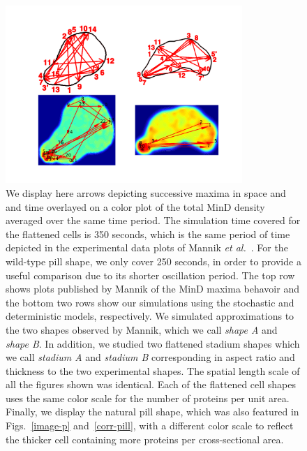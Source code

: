 \documentclass{pnastwo}
\begin{document}
\begin{figure}
  \centering
  \includegraphics[width=0.8\textwidth]{../paper/plot-ave}
  \caption{We display here arrows depicting successive maxima in space
    and and time overlayed on a color plot of the total MinD density
    averaged over the same time period.  The simulation time covered
    for the flattened cells is 350 seconds, which is the same
    period of time depicted in the experimental data plots of Mannik
    \emph{et al.}~\cite{mannik2012robustness}.  For the wild-type pill
    shape, we only cover 250 seconds, in order to provide a
    useful comparison due to its shorter oscillation period.  The top
    row shows plots published by Mannik of the MinD maxima behavoir
    and the bottom two rows show our simulations using the stochastic
    and deterministic models, respectively.  We simulated
    approximations to the two shapes observed by Mannik, which we call
    \emph{shape A} and \emph{shape B}.  In addition, we studied two
    flattened stadium shapes which we call \emph{stadium A} and
    \emph{stadium B} corresponding in aspect ratio and thickness to
    the two experimental shapes.  The spatial length scale of all the
    figures shown was identical. Each of the flattened cell shapes
    uses the same color scale for the number of proteins per unit
    area.  Finally, we display the natural pill shape, which was also
    featured in Figs.~\ref{image-p} and~\ref{corr-pill}, with a
    different color scale to reflect the thicker cell containing more
    proteins per cross-sectional area.  }
  \label{randst-plot-ave}
\end{figure}
\end{document}
